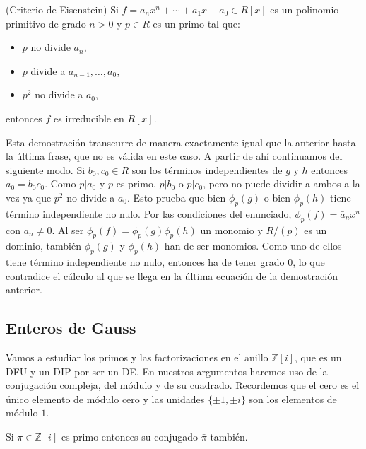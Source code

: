 \textrm{\normalfont (Criterio de Eisenstein)}\label{eisenstein}
Si \(f=a_nx^n+\cdots+a_1x+a_0\in R[x]\) es un polinomio primitivo de
grado \(n>0\) y \(p\in R\) es un primo tal que:

\begin{itemize}
\item
  \(p\) no divide \(a_n\),
\item
  \(p\) divide a \(a_{n-1},\dots,a_0\),
\item
  \(p^2\) no divide a \(a_0\),
\end{itemize}

entonces \(f\) es irreducible en \(R[x]\). 


Esta demostración transcurre de manera exactamente igual que la anterior
hasta la última frase, que no es válida en este caso. A partir de ahí
continuamos del siguiente modo. Si \(b_0, c_0\in R\) son los términos
independientes de \(g\) y \(h\) entonces \(a_0=b_0c_0\). Como \(p|a_0\)
y \(p\) es primo, \(p|b_0\) o \(p|c_0\), pero no puede dividir a ambos a
la vez ya que \(p^2\) no divide a \(a_0\). Esto prueba que bien
\(\phi_p(g)\) o bien \(\phi_p(h)\) tiene término independiente no nulo.
Por las condiciones del enunciado, \(\phi_p(f)=\bar a_nx^n\) con
\(\bar a_n\neq 0\). Al ser \(\phi_p(f)=\phi_p(g)\phi_p(h)\) un monomio y
\(R/(p)\) es un dominio, también \(\phi_p(g)\) y \(\phi_p(h)\) han de
ser monomios. Como uno de ellos tiene término independiente no nulo,
entonces ha de tener grado \(0\), lo que contradice el cálculo al que se
llega en la última ecuación de la demostración anterior.\\

\hypertarget{enteros-de-gauss}{%
\subsection{Enteros de Gauss}\label{enteros-de-gauss}}

Vamos a estudiar los primos y las factorizaciones en el anillo
\(\mathbb Z[i]\), que es un DFU y un DIP por ser un DE. En nuestros
argumentos haremos uso de la conjugación compleja, del módulo y de su
cuadrado. Recordemos que el cero es el único elemento de módulo cero y
las unidades \(\{\pm1,\pm i\}\) son los elementos de módulo \(1\).


Si \(\pi\in\mathbb Z[i]\) es primo entonces su conjugado \(\bar\pi\)
también. 

